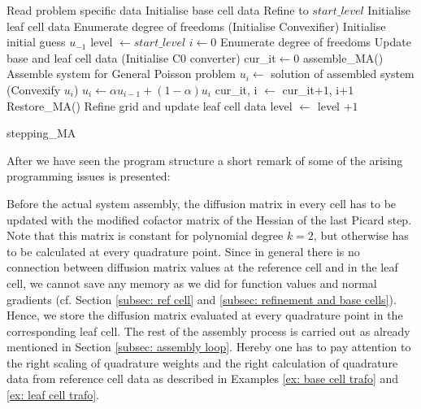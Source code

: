 \begin{algorithm}[H]
\begin{algorithmic}
	\State Read problem specific data
	\State Initialise base cell data
	\State Refine to $start\_level$
	\State Initialise leaf cell data
	\State Enumerate degree of freedoms
	\State (Initialise Convexifier)
	\State Initialise initial guess $u_{-1}$
	\State level $\gets start\_level$
	\State $i \gets 0$
		\State Enumerate degree of freedoms
		\State Update base and leaf cell data
		\State (Initialise C0 converter) 
		\State cur\_it$ \gets 0$
			\State  assemble\_MA()                              \Comment Assemble system for General Poisson problem
			\State $u_i \gets$ solution of assembled system
			\State (Convexify $u_i$)		 
			\State $u_i \gets \alpha u_{i-1}  +(1-\alpha) u_i$
			\State	cur\_it, i $\gets$ cur\_it$+1$, i$+1$
			\State Restore\_MA() 		
		\EndWhile
		\State Refine grid and update leaf cell data
		\State level $\gets$ level $+1$
	\EndWhile
\end{algorithmic}
\caption{stepping\_MA}
\label{alg: stepping}
\end{algorithm}

After we have seen the program structure a short remark of some of the arising programming issues is presented:

Before the actual system assembly, the diffusion matrix in every cell has to be updated with the modified cofactor matrix of the Hessian of the last Picard step. Note that this matrix is constant for polynomial degree $k=2$, but otherwise has to be calculated at every quadrature point. Since in general there is no connection between diffusion matrix values at the reference cell and in the leaf cell, we cannot save any memory as we did for function values and normal gradients (cf. Section \ref{subsec: ref cell} and \ref{subsec: refinement and base cells}). Hence, we store the diffusion matrix evaluated at every quadrature point in the corresponding leaf cell.
The rest of the assembly process is carried out as already mentioned in Section \ref{subsec: assembly loop}. Hereby one has to pay attention to the right scaling of quadrature weights and the right calculation of quadrature data from reference cell data as described in Examples \ref{ex: base cell trafo} and \ref{ex: leaf cell trafo}. 


